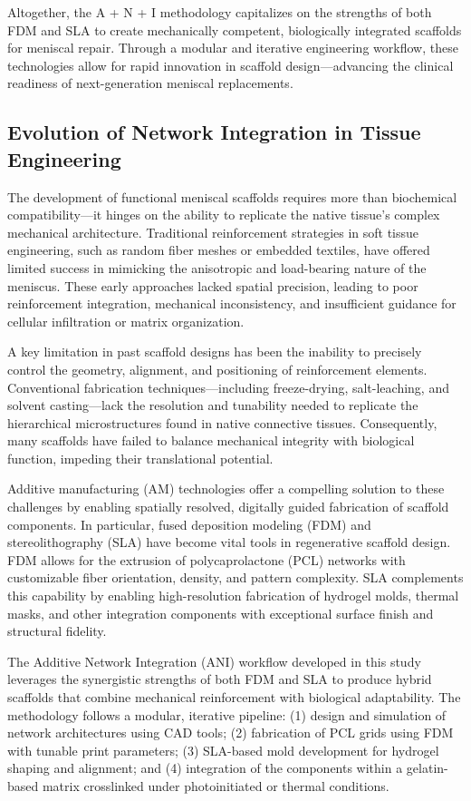 Altogether, the A + N + I methodology capitalizes on the strengths of both FDM and SLA to create mechanically competent, biologically integrated scaffolds for meniscal repair. Through a modular and iterative engineering workflow, these technologies allow for rapid innovation in scaffold design—advancing the clinical readiness of next-generation meniscal replacements.

\subsection{Evolution of Network Integration in Tissue Engineering}

The development of functional meniscal scaffolds requires more than biochemical compatibility—it hinges on the ability to replicate the native tissue's complex mechanical architecture. Traditional reinforcement strategies in soft tissue engineering, such as random fiber meshes or embedded textiles, have offered limited success in mimicking the anisotropic and load-bearing nature of the meniscus. These early approaches lacked spatial precision, leading to poor reinforcement integration, mechanical inconsistency, and insufficient guidance for cellular infiltration or matrix organization.

A key limitation in past scaffold designs has been the inability to precisely control the geometry, alignment, and positioning of reinforcement elements. Conventional fabrication techniques—including freeze-drying, salt-leaching, and solvent casting—lack the resolution and tunability needed to replicate the hierarchical microstructures found in native connective tissues. Consequently, many scaffolds have failed to balance mechanical integrity with biological function, impeding their translational potential.

Additive manufacturing (AM) technologies offer a compelling solution to these challenges by enabling spatially resolved, digitally guided fabrication of scaffold components. In particular, fused deposition modeling (FDM) and stereolithography (SLA) have become vital tools in regenerative scaffold design. FDM allows for the extrusion of polycaprolactone (PCL) networks with customizable fiber orientation, density, and pattern complexity. SLA complements this capability by enabling high-resolution fabrication of hydrogel molds, thermal masks, and other integration components with exceptional surface finish and structural fidelity.

The Additive Network Integration (ANI) workflow developed in this study leverages the synergistic strengths of both FDM and SLA to produce hybrid scaffolds that combine mechanical reinforcement with biological adaptability. The methodology follows a modular, iterative pipeline:  
(1) design and simulation of network architectures using CAD tools;  
(2) fabrication of PCL grids using FDM with tunable print parameters;  
(3) SLA-based mold development for hydrogel shaping and alignment; and  
(4) integration of the components within a gelatin-based matrix crosslinked under photoinitiated or thermal conditions.  

